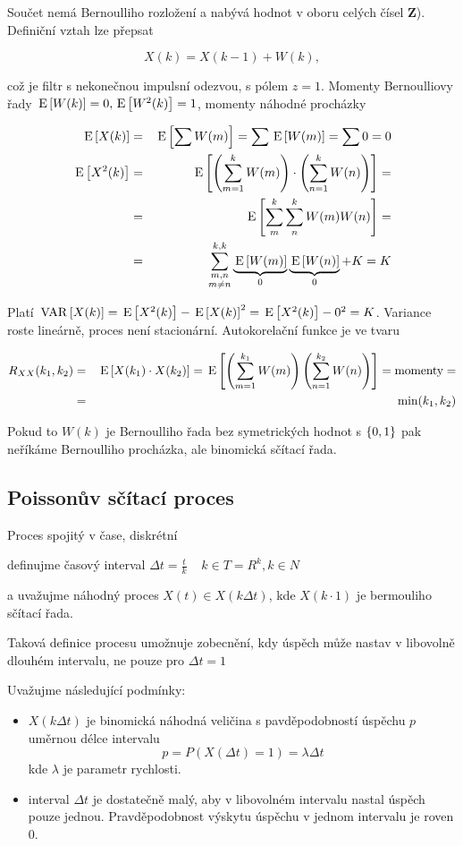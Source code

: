 Součet nemá Bernoulliho rozložení a nabývá hodnot v oboru celých čísel \textbf{Z}). Definiční vztah lze přepsat

\[ X(k) =X(k-1)+W(k), \]

což je filtr s nekonečnou impulsní odezvou, s pólem $z=1$. Momenty Bernoulliovy řady $\,\mathrm{E}\left[W(k)\right]=0,\,\mathrm{E}\left[W^2(k)\right]=1$, momenty náhodné procházky

\begin{eqnarray*}
\,\mathrm{E}\left[X(k)\right] & = & \,\mathrm{E}\left[\sum W(m)\right] =  \sum \,\mathrm{E}\left[W(m)\right] = \sum 0 = 0\\
\,\mathrm{E}\left[X^2(k)\right] & = & \,\mathrm{E}\left[\left(\sum_{m=1}^k W(m)\right)\cdot\left(\sum_{n=1}^k W(n)\right)\right]=\\
& = & \,\mathrm{E}\left[\sum_m^k\sum_n^k W(m)W(n)\right]=\\
& = & \sum^{k,k}_{\substack{m,n\\m\neq n}}\underbrace{\,\mathrm{E}\left[W(m)\right]}_0 \underbrace{\,\mathrm{E}\left[W(n)\right]}_0+K = K
\end{eqnarray*}

Platí $\,\mathrm{VAR}\left[X(k)\right]= \,\mathrm{E}\left[X^2(k)\right] - \,\mathrm{E}\left[X(k)\right]^2 = \,\mathrm{E}\left[X^2(k)\right] - 0^2 =  K$. Variance roste lineárně, proces není stacionární. Autokorelační funkce je ve tvaru

\begin{eqnarray*}
R_{XX}(k_1,k_2) &=& \,\mathrm{E}\left[X(k_1)\cdot X(k_2)\right]=\,\mathrm{E}\left[\left(\sum_{m=1}^{k_1}W(m)\right)\left(\sum_{n=1}^{k_2}W(n)\right)\right]=\text{momenty}=\\
& = & \min(k_1,k_2)
\end{eqnarray*}

Pokud to $W(k)$ je Bernoulliho řada bez symetrických hodnot s $ \left\{0,1\right\} $ pak neříkáme Bernoulliho procházka, ale binomická sčítací řada.



\subsection{Poissonův sčítací proces}

Proces spojitý v čase, diskrétní

definujme časový interval $ \Delta t = \frac{t}{k} \;\;\;\; k \in T = R^k, k \in N$

a uvažujme náhodný proces $X(t) \in X(k \Delta t)$, kde $X(k \cdot 1)$ je bermouliho sčítací řada.

Taková definice procesu umožnuje zobecnění, kdy úspěch může nastav v libovolně dlouhém intervalu, ne pouze pro $ \Delta t = 1$

Uvažujme následující podmínky:
\begin{itemize}
	\item $X(k \Delta t)$ je binomická náhodná veličina s pavděpodobností úspěchu $p$ uměrnou délce intervalu $$ p =P (X(\Delta t) = 1) = \lambda \Delta t$$ kde $\lambda$ je parametr rychlosti.
	\item interval $\Delta t$ je dostatečně malý, aby v libovolném intervalu nastal úspěch pouze jednou. Pravděpodobnost výskytu úspěchu v jednom intervalu je roven $0$.
\end{itemize}


